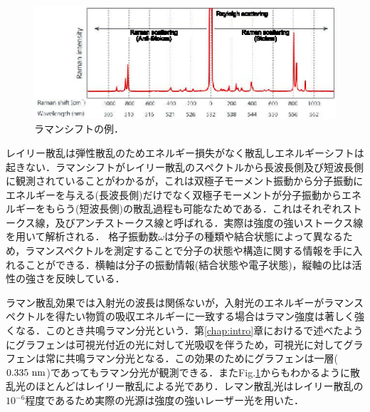 \begin{figure}[htbp]
\centerline{
\includegraphics[width=12cm]{images/ramanshift.eps}
}
\caption{ラマンシフトの例．
}
\label{fig:ramanshift} 
\end{figure}
レイリー散乱は弾性散乱のためエネルギー損失がなく散乱しエネルギーシフトは起きない．ラマンシフトがレイリー散乱のスペクトルから長波長側及び短波長側に観測されていることがわかるが，これは双極子モーメント振動から分子振動にエネルギーを与える(長波長側)だけでなく双極子モーメントが分子振動からエネルギーをもらう(短波長側)の散乱過程も可能なためである．これはそれぞれストークス線，及びアンチストークス線と呼ばれる．実際は強度の強いストークス線を用いて解析される．
格子振動数$\omega$は分子の種類や結合状態によって異なるため，ラマンスペクトルを測定することで分子の状態や構造に関する情報を手に入れることができる．横軸は分子の振動情報(結合状態や電子状態)，縦軸の比は活性の強さを反映している．




ラマン散乱効果では入射光の波長は関係ないが，入射光のエネルギーがラマンスペクトルを得たい物質の吸収エネルギーに一致する場合はラマン強度は著しく強くなる．このとき共鳴ラマン分光という．第\ref{chap:intro}章における\pageref{sec:graphene}で述べたようにグラフェンは可視光付近の光に対して光吸収を伴うため，可視光に対してグラフェンは常に共鳴ラマン分光となる．この効果のためにグラフェンは一層($0.335\rm\ nm$)であってもラマン分光が観測できる．またFig.\ref{fig:ramanshift}からもわかるように散乱光のほとんどはレイリー散乱による光であり．レマン散乱光はレイリー散乱の$10^{-6}$程度であるため実際の光源は強度の強いレーザー光を用いた．

